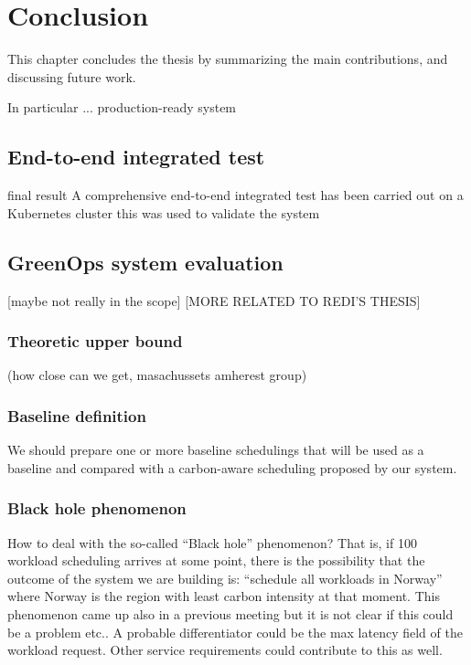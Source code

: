 \chapter{Conclusion}
\label{cha:conclusion}

This chapter concludes the thesis by summarizing the main contributions, and discussing future work.

In particular ...
production-ready system

\section{End-to-end integrated test}

final result
A comprehensive end-to-end integrated test has been carried out on a Kubernetes cluster
this was used to validate the system

\section{GreenOps system evaluation}

[maybe not really in the scope]
[MORE RELATED TO REDI'S THESIS]


\subsection{Theoretic upper bound}

 (how close can we get, masachussets amherest group)

\subsection{Baseline definition}

We should prepare one or more baseline schedulings that will be used as a baseline and compared with a carbon-aware scheduling proposed by our system.

\subsection{Black hole phenomenon}

How to deal with the so-called “Black hole” phenomenon?
That is, if 100 workload scheduling arrives at some point, there is the possibility that the outcome of the system we are building is: “schedule all workloads in Norway” where Norway is the region with least carbon intensity at that moment.
This phenomenon came up also in a previous meeting but it is not clear if this could be a problem etc..
A probable differentiator could be the max latency field of the workload request. Other service requirements could contribute to this as well.


